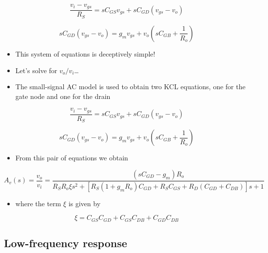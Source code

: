 \documentclass[11pt]{article}
\providecommand{\tightlist}{%
      \setlength{\itemsep}{0pt}\setlength{\parskip}{0pt}}
\begin{document}
    \begin{equation}
\dfrac{v_i - v_{gs}}{R_S} = sC_{GS}v_{gs} + sC_{GD}(v_{gs} - v_o)
\end{equation}

\begin{equation}
sC_{GD}(v_{gs} - v_o) = g_m v_{gs} + v_o\left(sC_{GB} + \dfrac{1}{R_o}\right)
\end{equation}

    \begin{itemize}
\tightlist
\item
  This system of equations is deceptively simple!
\item
  Let's solve for \(v_o/v_i\)\ldots{}
\end{itemize}

    \begin{itemize}
\tightlist
\item
  The small-signal AC model is used to obtain two KCL equations, one for
  the gate node and one for the drain
\end{itemize}

\begin{equation}
\dfrac{v_i - v_{gs}}{R_S} = sC_{GS}v_{gs} + sC_{GD}(v_{gs} - v_o)
\end{equation}

\begin{equation}
sC_{GD}(v_{gs} - v_o) = g_m v_{gs} + v_o\left(sC_{GB} + \dfrac{1}{R_o}\right)
\end{equation}

\begin{itemize}
\tightlist
\item
  From this pair of equations we obtain
\end{itemize}

\begin{equation}
A_v(s) =\dfrac{v_o}{v_i} = \dfrac{(sC_{GD} - g_m)R_o}{R_S R_o\xi s^2 + [R_S(1+g_mR_o)C_{GD} + R_SC_{GS}+R_D(C_{GD} + C_{DB})]s+1}
\end{equation}

\begin{itemize}
\tightlist
\item
  where the term \(\xi\) is given by
\end{itemize}

\begin{equation}
\xi = C_{GS}C_{GD} + C_{GS}C_{DB} + C_{GD}C_{DB}
\end{equation}

    \hypertarget{low-frequency-response}{%
\subsection{Low-frequency response}\label{low-frequency-response}}
\end{document}

